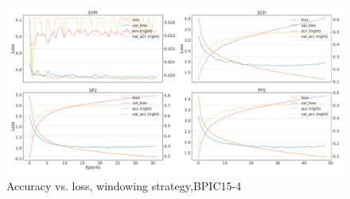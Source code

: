 \begin{figure}[!htb]
    \centering
    \includegraphics[width=\textwidth]{gfx/bpic2015_4/windowed_loss_acc_curve.pdf}
    \caption{Accuracy vs. loss, windowing strategy,BPIC15-4}
\end{figure}
\FloatBarrier

